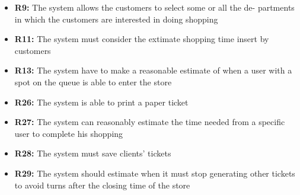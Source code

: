 \documentclass{article}
\begin{document}
\begin{center}
\begin{adjustwidth}{-2.8cm}{}
\begin{tabular}[h!]{|m{7.5em}|m{36em}|}
						\end{tabular}
					

				
					\end{adjustwidth}
				
														\begin{itemize}
					\bigskip
					\bigskip
					\bigskip
					\bigskip
					{\bfseries Required functional requirements: }
					
					
					\item {\bfseries R9: } The system allows the customers to select some or all the de-
					partments in which the customers are interested in doing shopping
					\item {\bfseries R11: } The system must consider the extimate shopping time insert
					by customers
					\item {\bfseries R13: } The system have to make a reasonable estimate of when a user with a spot on the queue is able to enter the store
					\item {\bfseries R26: } The system is able to print a paper ticket
					\item {\bfseries R27: } The system can reasonably estimate the time needed from a speciﬁc user to complete his shopping
					\item {\bfseries R28: } The system must save clients' tickets
					\item {\bfseries R29: } The system should estimate when it must stop generating other tickets to avoid turns after the closing time of the store
					
					
					

\end{itemize}
\end{center}
\end{document}

